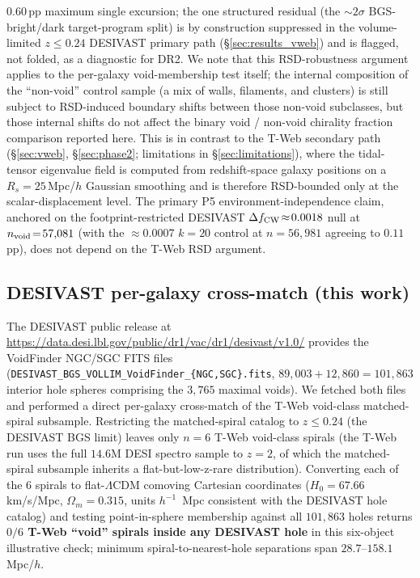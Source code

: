 \documentclass[aps,prd,twocolumn,superscriptaddress,showpacs,preprintnumbers,nofootinbib,longbibliography,floatfix]{revtex4-2}
\begin{document}
$0.60$\,pp maximum single excursion; the one
structured residual (the ${\sim}2\sigma$ BGS-bright/dark target-program
split) is by construction suppressed in the volume-limited $z\!\le\!0.24$
DESIVAST primary path (\S\ref{sec:results_vweb}) and is flagged, not folded,
as a diagnostic for DR2. We note that
this RSD-robustness argument applies to the per-galaxy void-membership
test itself; the internal composition of the ``non-void'' control
sample (a mix of walls, filaments, and clusters) is still subject to
RSD-induced boundary shifts between those non-void subclasses, but
those internal shifts do not affect the binary void / non-void
chirality fraction comparison reported here. This is in contrast to the T-Web secondary
path (\S\ref{sec:vweb}, \S\ref{sec:phase2}; limitations in
\S\ref{sec:limitations}), where the tidal-tensor eigenvalue
field is computed from redshift-space galaxy positions on a
$R_s\!=\!25$\,Mpc/$h$ Gaussian smoothing and is therefore
RSD-bounded only at the scalar-displacement level. The primary
P5 environment-independence claim, anchored on the footprint-restricted
DESIVAST $\Delta f_{\rm CW}\!\approx\!0.0018$ null at
$n_{\rm void}\!=\!57{,}081$ (with the $\approx\!0.0007$ $k\!=\!20$
control at $n\!=\!56{,}981$ agreeing to $0.11$\,pp), does not depend on
the T-Web RSD argument.

\fi
\subsection{DESIVAST per-galaxy cross-match (this work)}\label{sec:desivast_xmatch}

The DESIVAST
public release at
\url{https://data.desi.lbl.gov/public/dr1/vac/dr1/desivast/v1.0/}
provides the VoidFinder NGC/SGC FITS files
(\texttt{DESIVAST\_BGS\_VOLLIM\_VoidFinder\_\{NGC,SGC\}.fits},
$89{,}003 + 12{,}860 = 101{,}863$ interior hole spheres comprising the
$3{,}765$ maximal voids). We fetched both files and performed a direct
per-galaxy cross-match of the T-Web void-class matched-spiral
subsample. Restricting the matched-spiral catalog to $z \leq 0.24$
(the DESIVAST BGS limit) leaves only $n = 6$ T-Web void-class spirals
(the T-Web run uses the full $14.6$M DESI spectro sample to $z = 2$,
of which the matched-spiral subsample inherits a flat-but-low-z-rare
distribution). Converting each of the 6 spirals to flat-$\Lambda$CDM
comoving Cartesian coordinates ($H_0 = 67.66$ km/s/Mpc, $\Omega_m =
0.315$, units $h^{-1}$~Mpc consistent with the DESIVAST hole catalog)
and testing point-in-sphere membership against all $101{,}863$ holes
returns \textbf{$0/6$ T-Web ``void'' spirals inside any DESIVAST hole}
in this six-object illustrative check;
minimum spiral-to-nearest-hole separations span $28.7$--$158.1\,$Mpc/$h$.
\end{document}

